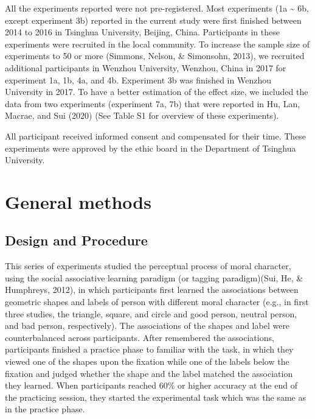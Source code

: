 \documentclass[
  english,
  man]{apa6}
\begin{document}
All the experiments reported were not pre-registered. Most experiments (1a \textasciitilde{} 6b, except experiment 3b) reported in the current study were first finished between 2014 to 2016 in Tsinghua University, Beijing, China. Participants in these experiments were recruited in the local community. To increase the sample size of experiments to 50 or more (Simmons, Nelson, \& Simonsohn, 2013), we recruited additional participants in Wenzhou University, Wenzhou, China in 2017 for experiment 1a, 1b, 4a, and 4b. Experiment 3b was finished in Wenzhou University in 2017. To have a better estimation of the effect size, we included the data from two experiments (experiment 7a, 7b) that were reported in Hu, Lan, Macrae, and Sui (2020) (See Table S1 for overview of these experiments).

All participant received informed consent and compensated for their time. These experiments were approved by the ethic board in the Department of Tsinghua University.

\hypertarget{general-methods}{%
\section{General methods}\label{general-methods}}

\hypertarget{design-and-procedure}{%
\subsection{Design and Procedure}\label{design-and-procedure}}

This series of experiments studied the perceptual process of moral character, using the social associative learning paradigm (or tagging paradigm)(Sui, He, \& Humphreys, 2012), in which participants first learned the associations between geometric shapes and labels of person with different moral character (e.g., in first three studies, the triangle, square, and circle and good person, neutral person, and bad person, respectively). The associations of the shapes and label were counterbalanced across participants. After remembered the associations, participants finished a practice phase to familiar with the task, in which they viewed one of the shapes upon the fixation while one of the labels below the fixation and judged whether the shape and the label matched the association they learned. When participants reached 60\% or higher accuracy at the end of the practicing session, they started the experimental task which was the same as in the practice phase.
\end{document}
